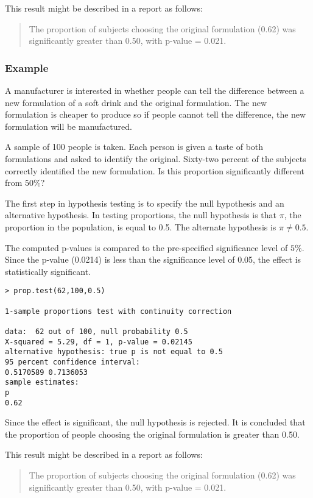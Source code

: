 \documentclass[a4paper,12pt]{article}
\begin{document}
This result might be described in a report as follows: 

\begin{quote}
	The proportion of subjects choosing the original formulation (0.62) was significantly greater than 0.50, with p-value = 0.021.
\end{quote}  



\newpage
\subsubsection{Example}
A manufacturer is interested in whether people can tell the difference between a new formulation of a soft drink and the original formulation. The new formulation is cheaper to produce so if people cannot tell the difference, the new formulation will be manufactured. 

A sample of 100 people is taken. Each person is given a taste of both formulations and asked to identify the original. Sixty-two percent of the subjects correctly identified the new formulation. Is this proportion significantly different from $50\%$? 

The first step in hypothesis testing is to specify the null hypothesis and an alternative hypothesis. In testing proportions, the null hypothesis is that $\pi$, the proportion in the population, is equal to 0.5. The alternate hypothesis is $\pi \neq 0.5$. 

The computed p-values is compared to the pre-specified significance level of $5\%$. Since the p-value (0.0214) is less than the significance level of 0.05, the effect is statistically significant. 
\begin{framed}
\begin{verbatim}
> prop.test(62,100,0.5)

1-sample proportions test with continuity correction

data:  62 out of 100, null probability 0.5 
X-squared = 5.29, df = 1, p-value = 0.02145
alternative hypothesis: true p is not equal to 0.5 
95 percent confidence interval:
0.5170589 0.7136053 
sample estimates:
p 
0.62 
\end{verbatim}
\end{framed}
Since the effect is significant, the null hypothesis is rejected. It is concluded that the proportion of people choosing the original formulation is greater than 0.50. 

This result might be described in a report as follows: 

\begin{quote}
	The proportion of subjects choosing the original formulation (0.62) was significantly greater than 0.50, with p-value = 0.021.
\end{quote}  

\end{document}
